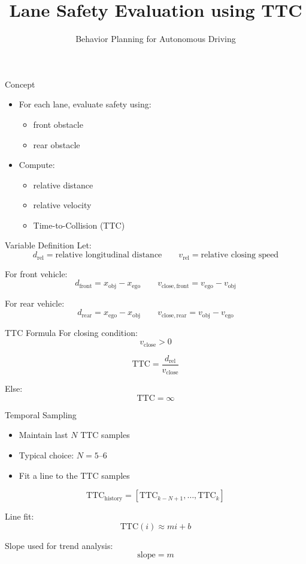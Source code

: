 \documentclass[aspectratio=169]{beamer}
\title{Lane Safety Evaluation using TTC}
\subtitle{Behavior Planning for Autonomous Driving}
\author{}
\date{}
\begin{document}
\begin{frame}
    \titlepage
\end{frame}

\begin{frame}{Concept}
\begin{itemize}
    \item For each lane, evaluate safety using:
    \begin{itemize}
        \item front obstacle
        \item rear obstacle
    \end{itemize}
    \item Compute:
    \begin{itemize}
        \item relative distance
        \item relative velocity
        \item Time-to-Collision (TTC)
    \end{itemize}
\end{itemize}
\end{frame}

\begin{frame}{Variable Definition}
Let:
\[
d_{\mathrm{rel}} = \text{relative longitudinal distance}
\qquad
v_{\mathrm{rel}} = \text{relative closing speed}
\]

\vspace{0.4em}
For front vehicle:
\[
d_{\mathrm{front}} = x_{\mathrm{obj}} - x_{\mathrm{ego}}
\qquad
v_{\mathrm{close,front}} = v_{\mathrm{ego}} - v_{\mathrm{obj}}
\]

For rear vehicle:
\[
d_{\mathrm{rear}} = x_{\mathrm{ego}} - x_{\mathrm{obj}}
\qquad
v_{\mathrm{close,rear}} = v_{\mathrm{obj}} - v_{\mathrm{ego}}
\]
\end{frame}

\begin{frame}{TTC Formula}
For closing condition:
\[
v_{\mathrm{close}} > 0
\]

\[
\mathrm{TTC} = \frac{d_{\mathrm{rel}}}{v_{\mathrm{close}}}
\]

Else:
\[
\mathrm{TTC} = \infty
\]
\end{frame}

\begin{frame}{Temporal Sampling}
\begin{itemize}
    \item Maintain last \(N\) TTC samples
    \item Typical choice: \(N = 5\text{--}6\)
    \item Fit a line to the TTC samples
\end{itemize}

\[
\mathrm{TTC}_{\mathrm{history}}
=
[\mathrm{TTC}_{k-N+1}, \ldots, \mathrm{TTC}_k]
\]

\vspace{0.4em}
Line fit:
\[
\mathrm{TTC}(i) \approx m i + b
\]

Slope used for trend analysis:
\[
\mathrm{slope} = m
\]
\end{frame}
\end{document}
